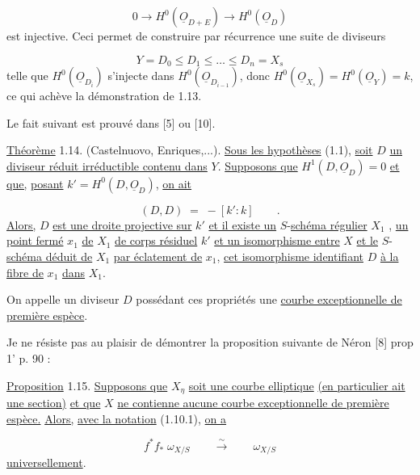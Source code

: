 \begin{equation*}
0 \longrightarrow H^0(\underline{O}_{D+E}) \longrightarrow H^0(\underline{O}_D)
\end{equation*}
est injective. Ceci permet de construire par récurrence une suite de diviseurs

\begin{equation*}
Y = D_0 \leq D_1 \leq \ldots \leq D_n = X_s
\end{equation*}
telle que $H^0(\underline{O}_{D_i})$ s'injecte dans $H^0(\underline{O}_{D_{i-1}})$, donc $H^0(\underline{O}_{X_s}) = H^0(\underline{O}_Y) = k$, ce qui achève la démonstration de 1.13.



Le fait suivant est prouvé dans [5] ou [10].

\underline{Théorème} 1.14. (Castelnuovo, Enriques,...). \underline{Sous les hypothèses} (1.1), \underline{soit} $D$ \underline{un diviseur réduit irréductible contenu dans} $Y$. \underline{Supposons que} $H^1(D,\underline{O}_D) = 0$ \underline{et que,} \underline{posant} $k' = H^0(D,\underline{O}_D)$, \underline{on ait}

\begin{equation*}
(D,D) \; = \; - [k' : k] \qquad .
\end{equation*}
\underline{Alors,} $D$ \underline{est une droite projective sur} $k'$ \underline{et il existe un} $S$-\underline{schéma régulier} $X_1$ , \underline{un point fermé} $x_1$ \underline{de} $X_1$ \underline{de corps résiduel} $k'$ \underline{et un isomorphisme entre} $X$ \underline{et le} $S$-\underline{schéma déduit de} $X_1$ \underline{par éclatement de} $x_1$, \underline{cet isomorphisme identifiant} $D$ \underline{à la fibre de} $x_1$ \underline{dans} $X_1$.

On appelle un diviseur $D$ possédant ces propriétés une \underline{courbe exceptionnelle de première espèce}.

Je ne résiste pas au plaisir de démontrer la proposition suivante de Néron [8] prop 1' p. 90 :

\underline{Proposition} 1.15. \underline{Supposons que} $X_\eta$ \underline{soit une courbe elliptique} \underline{(en particulier ait une section)} \underline{et que} $X$ \underline{ne contienne aucune courbe exceptionnelle de première espèce.} \underline{Alors,} \underline{avec la notation} (1.10.1), \underline{on a}

\begin{equation*}
f^*f_* \; \omega_{X/S} \qquad \stackrel{\sim}{\longrightarrow} \qquad \omega_{X/S}
\end{equation*}
\underline{universellement}.

